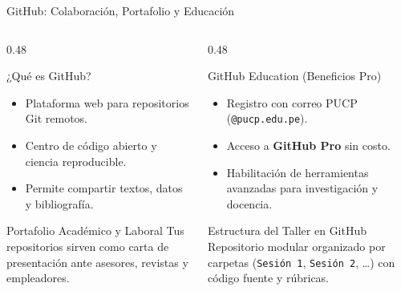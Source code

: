 \documentclass[aspectratio=169, 10pt]{beamer}
\begin{document}
\begin{frame}{GitHub: Colaboración, Portafolio y Educación}
  \begin{columns}[T]
    \begin{column}{0.48\textwidth}
      \begin{block}{¿Qué es GitHub?}
        \small
        \begin{itemize}
          \item Plataforma web para repositorios Git remotos.
          \item Centro de código abierto y ciencia reproducible.
          \item Permite compartir textos, datos y bibliografía.
        \end{itemize}
      \end{block}
      
      \vspace{0.1cm}
      \begin{exampleblock}{Portafolio Académico y Laboral}
        \footnotesize
        Tus repositorios sirven como carta de presentación ante asesores, revistas y empleadores.
      \end{exampleblock}
    \end{column}

    \begin{column}{0.48\textwidth}
      \begin{block}{GitHub Education (Beneficios Pro)}
        \small
        \begin{itemize}
          \item Registro con correo PUCP (\texttt{@pucp.edu.pe}).
          \item Acceso a \textbf{GitHub Pro} sin costo.
          \item Habilitación de herramientas avanzadas para investigación y docencia.
        \end{itemize}
      \end{block}

      \vspace{0.1cm}
      \begin{alertblock}{Estructura del Taller en GitHub}
        \footnotesize
        Repositorio modular organizado por carpetas (\texttt{Sesión 1}, \texttt{Sesión 2}, \dots) con código fuente y rúbricas.
      \end{alertblock}
    \end{column}
  \end{columns}
\end{frame}
\end{document}

